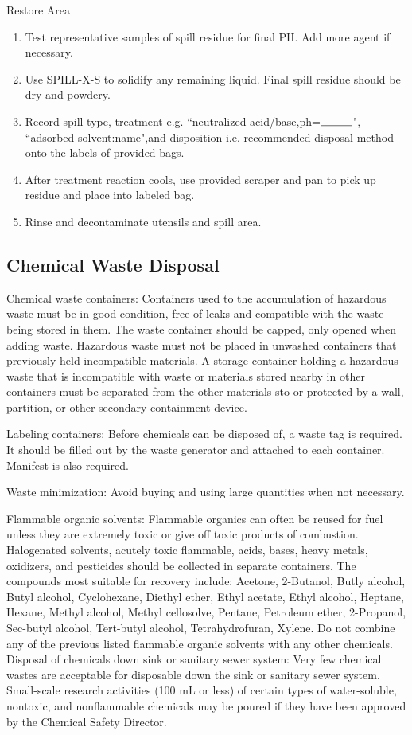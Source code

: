 \documentclass[12pt]{../SOP3}\usepackage[]{graphicx}\usepackage[]{color}
\begin{document}
\NP Restore Area
\begin{enumerate} 
  \item Test representative samples of spill residue for final PH. Add more agent if necessary. 
  \item Use SPILL-X-S to solidify any remaining liquid. Final spill residue should be dry and powdery.
  \item Record spill type, treatment e.g. ``neutralized acid/base,ph=$\rule{1cm}{0.15mm}$", ``adsorbed solvent:name",and disposition i.e. recommended disposal method onto the labels of provided bags. 
  \item After treatment reaction cools, use provided scraper and pan to pick up residue and place into labeled bag.
  \item Rinse and decontaminate utensils and spill area.
\end{enumerate}

\subsection*{Chemical Waste Disposal}

\NP Chemical waste containers: Containers used to the accumulation of hazardous waste must be in good condition, free of leaks and compatible with the waste being stored in them. The waste container should be capped, only opened when adding waste. Hazardous waste must not be placed in unwashed containers that previously held incompatible materials.  A storage container holding a hazardous waste that is incompatible with waste or materials stored nearby in other containers must be separated from the other materials  sto or protected by a wall, partition, or other secondary containment device. 

\NP Labeling containers: Before chemicals can be disposed of, a waste tag is required. It should be filled out by the waste generator and attached to each container. Manifest is also required. 

\NP Waste minimization: Avoid buying and using large quantities when not necessary. 

\NP Flammable organic solvents: Flammable organics can often be reused for fuel unless they are extremely toxic or give off toxic products of combustion. Halogenated solvents, acutely toxic flammable, acids, bases, heavy metals, oxidizers, and pesticides should be collected in separate containers. The compounds most suitable for recovery include: Acetone, 2-Butanol, Butly alcohol, Butyl alcohol, Cyclohexane, Diethyl ether, Ethyl acetate, Ethyl alcohol, Heptane, Hexane, Methyl alcohol, Methyl cellosolve, Pentane, Petroleum ether, 2-Propanol, Sec-butyl alcohol, Tert-butyl alcohol, Tetrahydrofuran, Xylene. Do not combine any of the previous listed flammable organic solvents with any other chemicals. 
Disposal of chemicals down sink or sanitary sewer system:
Very few chemical wastes are acceptable for disposable down the sink or sanitary sewer system. Small-scale research activities (100 mL or less) of certain types of water-soluble, nontoxic, and nonflammable chemicals may be poured if they have been approved by the Chemical Safety Director. 
\end{document}
